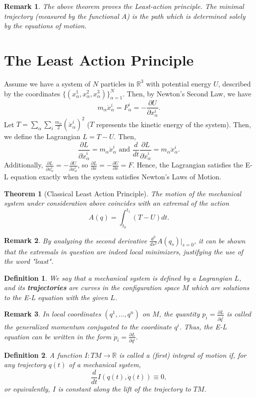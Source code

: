 \documentclass{article}
\newcommand{\R}{\mathbb R}
\newcommand{\al}{\alpha}
\newcommand{\pdof}[2]{\frac{\partial #1}{\partial #2}}
\newtheorem{thm}{Theorem}
\newtheorem{defn}{Definition}
\newtheorem{rmk}{Remark}
\begin{document}
\begin{rmk}
    The above theorem proves the Least-action principle. The minimal trajectory (measured by the functional $A$) is the path which is determined solely by the equations of motion.
\end{rmk}
\section{The Least Action Principle}
Assume we have a system of $N$ particles in $\R^3$ with potential energy $U$, described by the coordinates $\{(x_\al^1,x_\al^2,x_\al^3)\}_{\al=1}^N$. Then, by Newton's Second Law, we have
\[m_\al \ddot x_\al^i = F_\al^i = -\pdof{U}{x_\al^i}.\]
Let $T = \sum_\al\sum_i \frac{m_\al}{2} (\dot x^i_\al)^2$ ($T$ represents the kinetic energy of the system). Then, we define the Lagrangian $L = T-U$. Then,
\[\pdof{L}{\dot x_\al^i} = m_\al\dot x_\al^i\text{ and }\frac{d}{dt}\pdof{L}{\dot x_{\al}^i} = m_\al \ddot x_{\al}^i.\]
Additionally, $\pdof{L}{x_\al^i} = -\pdof{U}{x_\al^i}$, so $\pdof{L}{x} = -\pdof{U}{x} = F$. Hence, the Lagrangian satisfies the E-L equation exactly when the system satisfies Newton's Laws of Motion.
\begin{thm}[Classical Least Action Principle]
    The motion of the mechanical system under consideration above coincides with an extremal of the action
    \[A(q) = \int_{t_0}^{t_1}(T-U)dt.\]
\end{thm}
\begin{rmk}
    By analyzing the second derivative $\frac{d^2}{ds^2}A(q_s)\big|_{s=0}$, it can be shown that the extremals in question are indeed local minimizers, justifying the use of the word "least".
\end{rmk}
\begin{defn}
    We say that a mechanical system is defined by a Lagrangian $L$, and its \textbf{trajectories} are curves in the configuration space $M$ which are solutions to the E-L equation with the given $L$.
\end{defn}
\begin{rmk}
    In local coordinates $(q^1,\dots,q^n)$ on $M$, the quantity $p_i = \pdof{L}{\dot q^i}$ is called the generalized momentum conjugated to the coordinate $q^i$. Thus, the E-L equation can be written in the form $\dot p_i = \pdof{L}{q^i}$.
\end{rmk}
\begin{defn}
    A function $I:TM\to \R$ is called a (first) integral of motion if, for any trajectory $q(t)$ of a mechanical system, 
    \[\frac{d}{dt}I(q(t),\dot q(t))\equiv 0,\]
    or equivalently, $I$ is constant along the lift of the trajectory to $TM$.
\end{defn}
\end{document}
